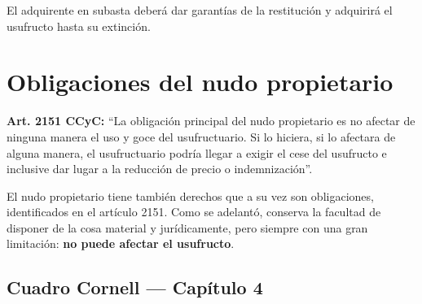 \documentclass[12pt,oneside]{book}
\begin{document}
El adquirente en subasta deberá dar garantías de la restitución y adquirirá el usufructo hasta su extinción.

\section{Obligaciones del nudo propietario}

\begin{important}
\textbf{Art. 2151 CCyC:} ``La obligación principal del nudo propietario es no afectar de ninguna manera el uso y goce del usufructuario. Si lo hiciera, si lo afectara de alguna manera, el usufructuario podría llegar a exigir el cese del usufructo e inclusive dar lugar a la reducción de precio o indemnización''.
\end{important}

El nudo propietario tiene también derechos que a su vez son obligaciones, identificados en el artículo 2151. Como se adelantó, conserva la facultad de disponer de la cosa material y jurídicamente, pero siempre con una gran limitación: \textbf{no puede afectar el usufructo}.

\subsection*{Cuadro Cornell --- Capítulo 4}
\end{document}
